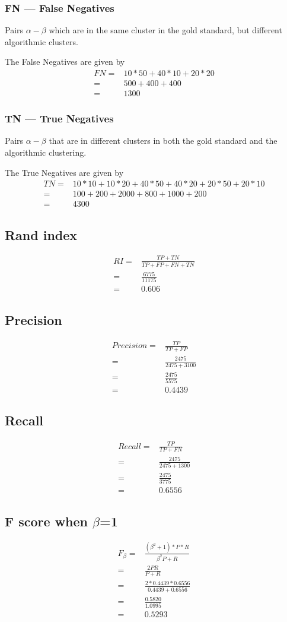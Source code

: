 \documentclass{article}
\begin{document}
\subsubsection{FN --- False Negatives}
Pairs $ \alpha -  \beta $ which are in the same cluster in the gold standard, but different algorithmic clusters.

The False Negatives are given by 
\begin{align*}
  FN =& 10*50 + 40*10 + 20*20 \\
  =& 500 + 400 + 400 \\
  =& 1300
\end{align*}

\subsubsection{TN --- True Negatives}
Pairs $ \alpha -  \beta $ that are in different clusters in both the gold standard and the algorithmic clustering.

The True Negatives are given by 
\begin{align*}
  TN =& 10*10 + 10*20 + 40*50 + 40*20 + 20*50 + 20*10 \\
  =& 100 + 200 + 2000 + 800 + 1000 + 200 \\
  =& 4300
\end{align*}

\subsection{Rand index}
\begin{align*}
  RI = & \frac{TP + TN}{TP + FP + FN + TN} \\
  =& \frac{6775}{11175} \\
  =& 0.606
\end{align*}

\subsection{Precision}
\begin{align*}
  Precision =& \frac{TP}{TP+FP} \\
  =& \frac{2475}{2475 + 3100}\\
  =& \frac{2475}{5575} \\
  =& 0.4439
\end{align*}

\subsection{Recall}
\begin{align*}
  Recall =& \frac{TP}{TP + FN} \\
  =& \frac{2475}{2475 + 1300} \\
  =& \frac{2475}{3775} \\
  =& 0.6556
\end{align*}

\subsection{F score when $\beta$=1}
\begin{align*}
  F_{\beta} =& \frac{(\beta^{2} + 1) * P * R}{\beta^{2}P + R} \\
  =& \frac{2PR}{P+R} \\
  =& \frac{2 * 0.4439 * 0.6556}{0.4439 + 0.6556} \\
  =& \frac{0.5820}{1.0995} \\
  =& 0.5293
\end{align*}
\end{document}
